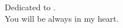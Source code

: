 \thispagestyle{empty}
{}

\vspace*{3cm}

\begin{center}
    Dedicated to . \\
    You will be always in my heart.
\end{center}

\medskip
